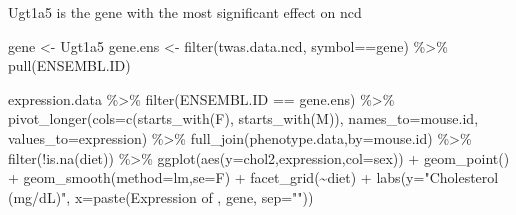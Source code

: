\documentclass[
]{article}
\newenvironment{Shaded}{\begin{snugshade}}{\end{snugshade}}
\newcommand{\AttributeTok}[1]{\textcolor[rgb]{0.77,0.63,0.00}{#1}}
\newcommand{\FunctionTok}[1]{\textcolor[rgb]{0.00,0.00,0.00}{#1}}
\newcommand{\NormalTok}[1]{#1}
\newcommand{\OtherTok}[1]{\textcolor[rgb]{0.56,0.35,0.01}{#1}}
\newcommand{\SpecialCharTok}[1]{\textcolor[rgb]{0.00,0.00,0.00}{#1}}
\newcommand{\StringTok}[1]{\textcolor[rgb]{0.31,0.60,0.02}{#1}}
\begin{document}
Ugt1a5 is the gene with the most significant effect on ncd

\begin{Shaded}
\begin{Highlighting}[]
\NormalTok{gene }\OtherTok{\textless{}{-}} \StringTok{\textquotesingle{}Ugt1a5\textquotesingle{}}
\NormalTok{gene.ens }\OtherTok{\textless{}{-}} \FunctionTok{filter}\NormalTok{(twas.data.ncd, symbol}\SpecialCharTok{==}\NormalTok{gene) }\SpecialCharTok{\%\textgreater{}\%} \FunctionTok{pull}\NormalTok{(ENSEMBL.ID)}

\NormalTok{expression.data }\SpecialCharTok{\%\textgreater{}\%}
  \FunctionTok{filter}\NormalTok{(ENSEMBL.ID }\SpecialCharTok{==}\NormalTok{ gene.ens) }\SpecialCharTok{\%\textgreater{}\%}
  \FunctionTok{pivot\_longer}\NormalTok{(}\AttributeTok{cols=}\FunctionTok{c}\NormalTok{(}\FunctionTok{starts\_with}\NormalTok{(}\StringTok{\textquotesingle{}F\textquotesingle{}}\NormalTok{),}
                      \FunctionTok{starts\_with}\NormalTok{(}\StringTok{\textquotesingle{}M\textquotesingle{}}\NormalTok{)),}
               \AttributeTok{names\_to=}\StringTok{\textquotesingle{}mouse.id\textquotesingle{}}\NormalTok{,}
               \AttributeTok{values\_to=}\StringTok{\textquotesingle{}expression\textquotesingle{}}\NormalTok{) }\SpecialCharTok{\%\textgreater{}\%}
  \FunctionTok{full\_join}\NormalTok{(phenotype.data,}\AttributeTok{by=}\StringTok{\textquotesingle{}mouse.id\textquotesingle{}}\NormalTok{) }\SpecialCharTok{\%\textgreater{}\%}
  \FunctionTok{filter}\NormalTok{(}\SpecialCharTok{!}\FunctionTok{is.na}\NormalTok{(diet)) }\SpecialCharTok{\%\textgreater{}\%}
  \FunctionTok{ggplot}\NormalTok{(}\FunctionTok{aes}\NormalTok{(}\AttributeTok{y=}\NormalTok{chol2,expression,}\AttributeTok{col=}\NormalTok{sex)) }\SpecialCharTok{+}
  \FunctionTok{geom\_point}\NormalTok{() }\SpecialCharTok{+}
  \FunctionTok{geom\_smooth}\NormalTok{(}\AttributeTok{method=}\StringTok{\textquotesingle{}lm\textquotesingle{}}\NormalTok{,}\AttributeTok{se=}\NormalTok{F) }\SpecialCharTok{+}
  \FunctionTok{facet\_grid}\NormalTok{(}\SpecialCharTok{\textasciitilde{}}\NormalTok{diet) }\SpecialCharTok{+}
  \FunctionTok{labs}\NormalTok{(}\AttributeTok{y=}\StringTok{"Cholesterol (mg/dL)"}\NormalTok{,}
       \AttributeTok{x=}\FunctionTok{paste}\NormalTok{(}\StringTok{\textquotesingle{}Expression of \textquotesingle{}}\NormalTok{, gene, }\AttributeTok{sep=}\StringTok{""}\NormalTok{))}
\end{Highlighting}
\end{Shaded}
\end{document}
